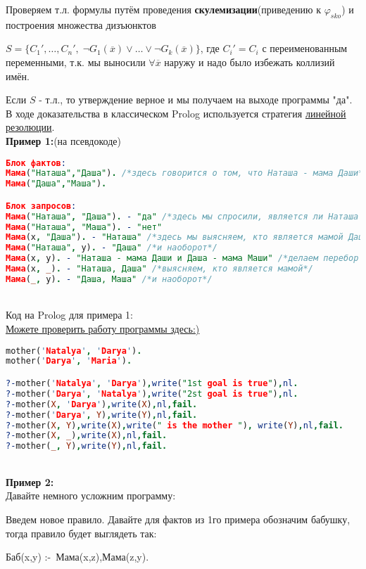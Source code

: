 \documentclass[18pt, a4paper]{extarticle}
\newcommand{\primerT}[1]{\textbf{Пример #1:\;}}
\newcommand{\ovl}[1]{\overline{#1}}
\newcommand{\vp}{\varphi}
\newcommand{\toPr}{:\!\!\text{-}}
\begin{document}
Проверяем т.л. формулы путём проведения \textbf{скулемизации}(приведению к $\vp_{sko}$) и построения множества дизъюнктов 

$S=\{C_1',\dots, C_n',\;\lnot G_1(\ovl x)\vee\dots\vee \lnot G_k(\ovl x)\}$, где $C_i'=C_i$ с переименованным переменными, т.к. мы выносили $\forall\ovl x$ наружу и надо было избежать коллизий имён.

Если $S$ - т.л., то утверждение верное и мы получаем на выходе программы "да"{}. В ходе доказательства в классическом Prolog используется стратегия \underline{линейной резолюции}.\\

\primerT 1(на псевдокоде)
\begin{lstlisting}[language=Prolog,mathescape,basicstyle=\ttfamily\footnotesize]
Блок фактов:
Мама("Наташа","Даша"). /*здесь говорится о том, что Наташа - мама Даши*/
Мама("Даша","Маша").

Блок запросов:
Мама("Наташа", "Даша"). - "да" /*здесь мы спросили, является ли Наташа мамой Даши?*/
Мама("Наташа", "Маша"). - "нет"
Мама(x, "Даша"). - "Наташа" /*здесь мы выясняем, кто является мамой Даши*/
Мама("Наташа", y). - "Даша" /*и наоборот*/
Мама(x, y). - "Наташа - мама Даши и Даша - мама Маши" /*делаем перебор фактов*/
Мама(x, _). - "Наташа, Даша" /*выясняем, кто является мамой*/
Мама(_, y). - "Даша, Маша" /*и наоборот*/
\end{lstlisting}\leavevmode\\
Код на Prolog для примера 1:\\
\href{https://rextester.com/l/prolog}{\underline{Можете проверить работу программы здесь:)}}
\begin{lstlisting}[language=Prolog,mathescape,basicstyle=\ttfamily\footnotesize]
mother('Natalya', 'Darya').
mother('Darya', 'Maria').

?-mother('Natalya', 'Darya'),write("1st goal is true"),nl.
?-mother('Darya', 'Natalya'),write("2st goal is true"),nl.
?-mother(X, 'Darya'),write(X),nl,fail.
?-mother('Darya', Y),write(Y),nl,fail.
?-mother(X, Y),write(X),write(" is the mother "), write(Y),nl,fail.
?-mother(X, _),write(X),nl,fail.
?-mother(_, Y),write(Y),nl,fail.
\end{lstlisting}\leavevmode\\
\primerT 2\\
Давайте немного усложним программу:

Введем новое правило. Давайте для фактов из 1го примера обозначим бабушку, тогда правило будет выглядеть так:
\begin{center}
    Баб(x,y) $\toPr$ Мама(x,z),Мама(z,y).
\end{center}
\end{document}
